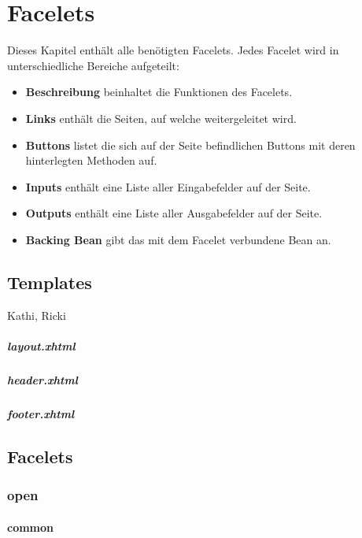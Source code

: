 \chapter{Facelets}

	Dieses Kapitel enthält alle benötigten  Facelets. Jedes Facelet wird in unterschiedliche  Bereiche aufgeteilt:
	\begin{itemize}
		\item \textbf{Beschreibung} beinhaltet die Funktionen des Facelets.
		\item \textbf{Links} enthält die Seiten, auf welche weitergeleitet wird.
		\item \textbf{Buttons} listet die sich auf der Seite befindlichen Buttons mit deren hinterlegten Methoden auf.
		\item \textbf{Inputs} enthält eine Liste aller Eingabefelder auf der Seite.
		\item \textbf{Outputs} enthält eine Liste aller Ausgabefelder auf der Seite.
		\item \textbf{Backing Bean} gibt das mit dem Facelet verbundene Bean an.
	\end{itemize}
	
	\section{Templates}
		Kathi, Ricki
	
		\paragraph{layout.xhtml}
		
		\paragraph{header.xhtml}
		
		\paragraph{footer.xhtml}
	
	\section{Facelets}
	
		\subsection{open}
			
			\subsubsection{common}
			
